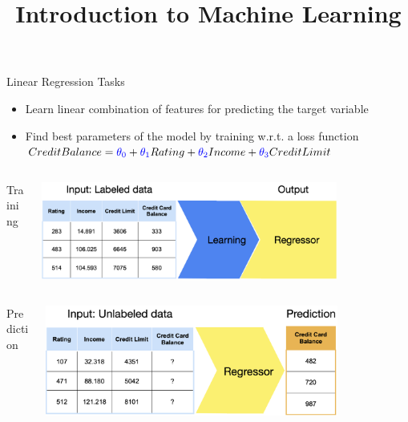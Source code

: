 \documentclass[11pt,compress,t,notes=noshow, xcolor=table]{beamer}
\title{Introduction to Machine Learning}
\date{}
\begin{document}
\sloppy

\begin{vbframe}{Linear Regression Tasks}
\begin{itemize}
\item \small Learn linear combination of features for predicting the target variable
\item \small Find best parameters of the model by training w.r.t. a loss function $Credit Balance = \textcolor{blue}{\theta_0} + \textcolor{blue}{\theta_1}Rating + \textcolor{blue}{\theta_2}Income + \textcolor{blue}{\theta_3}Credit Limit$

\end{itemize}

\begin{columns}  
\begin{column}{0.1\textwidth} 
\begin{center}
Training
\end{center}
\end{column}
\begin{column}{0.9\textwidth} 
\begin{center}
  \includegraphics[width = 0.8\textwidth]{figure_man/nutshell-regression-learning-task.png}
\end{center}
\end{column}
\end{columns}
\begin{columns}
\begin{column}{0.1\textwidth} 
\begin{center}
Prediction
\end{center}
\end{column}
\begin{column}{0.9\textwidth} 
\begin{center}
  \includegraphics[width = 0.8\textwidth]{figure_man/nutshell-regression-prediction-task.png} 
\end{center}
\end{column}
\end{columns}


\end{vbframe}
\end{document}
